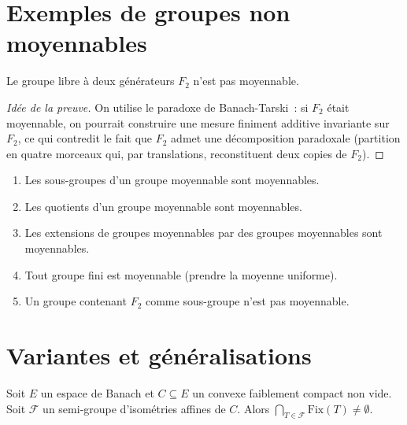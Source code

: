 \section{Exemples de groupes non moyennables}

\begin{theoreme}
Le groupe libre \`a deux g\'en\'erateurs $F_2$ n'est pas moyennable.
\end{theoreme}

\begin{proof}[Id\'ee de la preuve]
On utilise le paradoxe de Banach-Tarski~: si $F_2$ \'etait moyennable, on pourrait
construire une mesure finiment additive invariante sur $F_2$, ce qui contredit le fait que
$F_2$ admet une d\'ecomposition paradoxale (partition en quatre morceaux qui, par
translations, reconstituent deux copies de $F_2$).
\end{proof}

\begin{proposition}
\begin{enumerate}
  \item Les sous-groupes d'un groupe moyennable sont moyennables.
  \item Les quotients d'un groupe moyennable sont moyennables.
  \item Les extensions de groupes moyennables par des groupes moyennables sont moyennables.
  \item Tout groupe fini est moyennable (prendre la moyenne uniforme).
  \item Un groupe contenant $F_2$ comme sous-groupe n'est pas moyennable.
\end{enumerate}
\end{proposition}

\section{Variantes et g\'en\'eralisations}

\begin{theoreme}
\label{thm:ryll-nardzewski}
Soit $E$ un espace de Banach et $C \subseteq E$ un convexe faiblement compact non vide.
Soit $\mathcal{F}$ un semi-groupe d'isom\'etries affines de $C$. Alors
$\bigcap_{T \in \mathcal{F}} \mathrm{Fix}(T) \neq \emptyset$.
\end{theoreme}

